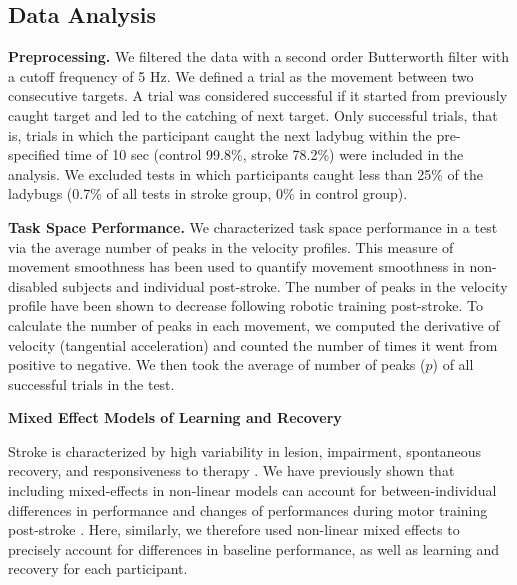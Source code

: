 \subsection{Data Analysis}

\textbf{Preprocessing.}
We filtered the data with a second order Butterworth filter \cite{Butterworth1930} with a cutoff frequency of 5 Hz. 
We defined a trial as the movement between two consecutive targets. 
A trial was considered successful if it started from previously caught target and led to the catching of next target. 
Only successful trials, that is, trials in which the participant caught the next ladybug within the pre-specified time of 10 sec (control 99.8\%, stroke 78.2\%) were included in the analysis. 
We excluded tests in which participants caught less than 25\% of the ladybugs (0.7\% of all tests in stroke group, 0\% in control group).

\textbf{Task Space Performance.}
We characterized task space performance in a test via the average number of peaks in the velocity profiles. 
This measure of movement smoothness has been used to quantify movement smoothness in non-disabled subjects \cite{Brooks1973} and individual post-stroke. 
The number of peaks in the velocity profile have been shown to decrease following robotic training post-stroke.  
To calculate the number of peaks in each movement, we computed the derivative of velocity (tangential acceleration) and counted the number of times it went from positive to negative. 
We then took the average of number of peaks ($ p $) of all successful trials in the test. 

\textbf{Mixed Effect Models of Learning and Recovery}

Stroke is characterized by high variability in lesion, impairment, spontaneous recovery, and responsiveness to therapy \cite{Cramer2008}. 
We have previously shown that including mixed-effects in non-linear models can account for between-individual differences in performance and changes of performances during motor training post-stroke \cite{Park2017}. 
Here, similarly, we therefore used non-linear mixed effects to precisely account for differences in baseline performance, as well as learning and recovery for each participant. 


